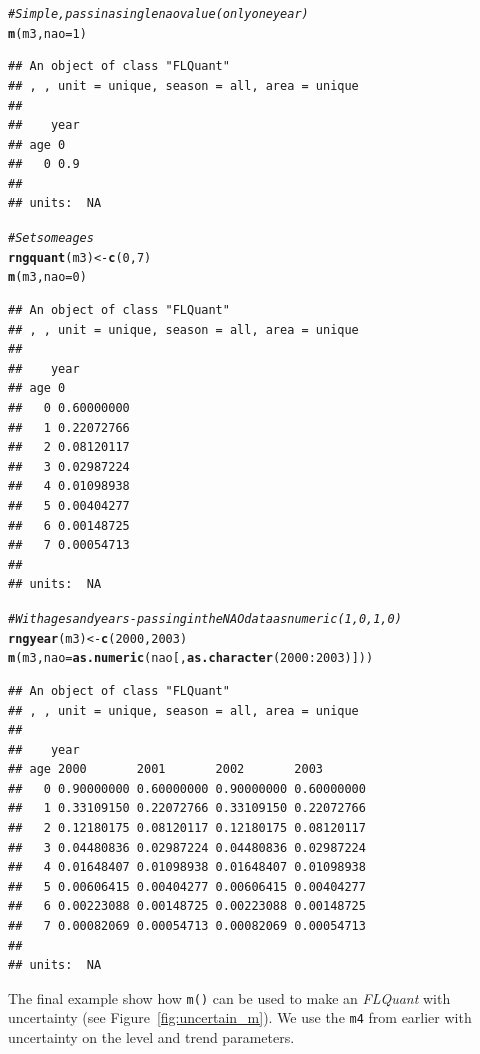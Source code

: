 \documentclass[a4paper,english,10pt]{article}\usepackage[]{graphicx}\usepackage[]{color}
\makeatletter
\newcommand{\hlnum}[1]{\textcolor[rgb]{0.686,0.059,0.569}{#1}}%
\newcommand{\hlcom}[1]{\textcolor[rgb]{0.678,0.584,0.686}{\textit{#1}}}%
\newcommand{\hlopt}[1]{\textcolor[rgb]{0,0,0}{#1}}%
\newcommand{\hlstd}[1]{\textcolor[rgb]{0.345,0.345,0.345}{#1}}%
\newcommand{\hlkwb}[1]{\textcolor[rgb]{0.69,0.353,0.396}{#1}}%
\newcommand{\hlkwc}[1]{\textcolor[rgb]{0.333,0.667,0.333}{#1}}%
\newcommand{\hlkwd}[1]{\textcolor[rgb]{0.737,0.353,0.396}{\textbf{#1}}}%
\newenvironment{kframe}{%
 \def\at@end@of@kframe{}%
 \ifinner\ifhmode%
  \def\at@end@of@kframe{\end{minipage}}%
  \begin{minipage}{\columnwidth}%
 \fi\fi%
 \def\FrameCommand##1{\hskip\@totalleftmargin \hskip-\fboxsep
 \colorbox{shadecolor}{##1}\hskip-\fboxsep
     \hskip-\linewidth \hskip-\@totalleftmargin \hskip\columnwidth}%
 \MakeFramed {\advance\hsize-\width
   \@totalleftmargin\z@ \linewidth\hsize
   \@setminipage}}%
 {\par\unskip\endMakeFramed%
 \at@end@of@kframe}
\newenvironment{knitrout}{}{} %
\newcommand{\code}[1]{{\texttt{#1}}}
\newcommand{\class}[1]{{\textit{#1}}}
\makeatother
\begin{document}
\begin{knitrout}
\color{fgcolor}\begin{kframe}
\begin{alltt}
\hlcom{# Simple, pass in a single nao value (only one year)}
\hlkwd{m}\hlstd{(m3,} \hlkwc{nao} \hlstd{=} \hlnum{1}\hlstd{)}
\end{alltt}
\begin{verbatim}
## An object of class "FLQuant"
## , , unit = unique, season = all, area = unique
## 
##    year
## age 0  
##   0 0.9
## 
## units:  NA
\end{verbatim}
\begin{alltt}
\hlcom{# Set some ages}
\hlkwd{rngquant}\hlstd{(m3)} \hlkwb{<-} \hlkwd{c}\hlstd{(}\hlnum{0}\hlstd{,} \hlnum{7}\hlstd{)}
\hlkwd{m}\hlstd{(m3,} \hlkwc{nao} \hlstd{=} \hlnum{0}\hlstd{)}
\end{alltt}
\begin{verbatim}
## An object of class "FLQuant"
## , , unit = unique, season = all, area = unique
## 
##    year
## age 0         
##   0 0.60000000
##   1 0.22072766
##   2 0.08120117
##   3 0.02987224
##   4 0.01098938
##   5 0.00404277
##   6 0.00148725
##   7 0.00054713
## 
## units:  NA
\end{verbatim}
\begin{alltt}
\hlcom{# With ages and years - passing in the NAO data as numeric (1,0,1,0)}
\hlkwd{rngyear}\hlstd{(m3)} \hlkwb{<-} \hlkwd{c}\hlstd{(}\hlnum{2000}\hlstd{,} \hlnum{2003}\hlstd{)}
\hlkwd{m}\hlstd{(m3,} \hlkwc{nao} \hlstd{=} \hlkwd{as.numeric}\hlstd{(nao[,} \hlkwd{as.character}\hlstd{(}\hlnum{2000}\hlopt{:}\hlnum{2003}\hlstd{)]))}
\end{alltt}
\begin{verbatim}
## An object of class "FLQuant"
## , , unit = unique, season = all, area = unique
## 
##    year
## age 2000       2001       2002       2003      
##   0 0.90000000 0.60000000 0.90000000 0.60000000
##   1 0.33109150 0.22072766 0.33109150 0.22072766
##   2 0.12180175 0.08120117 0.12180175 0.08120117
##   3 0.04480836 0.02987224 0.04480836 0.02987224
##   4 0.01648407 0.01098938 0.01648407 0.01098938
##   5 0.00606415 0.00404277 0.00606415 0.00404277
##   6 0.00223088 0.00148725 0.00223088 0.00148725
##   7 0.00082069 0.00054713 0.00082069 0.00054713
## 
## units:  NA
\end{verbatim}
\end{kframe}
\end{knitrout}


The final example show how \code{m()} can be used to make an \class{FLQuant} with uncertainty (see Figure~\ref{fig:uncertain_m}). We use the \code{m4} from earlier with uncertainty on the level and trend parameters.
\end{document}
